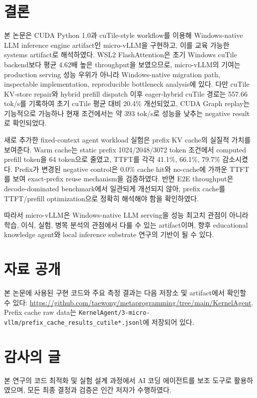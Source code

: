 \documentclass{kcc}
\begin{document}
\section{결론}
본 논문은 CUDA Python 1.0과 cuTile-style workflow를 이용해 Windows-native LLM inference engine artifact인 micro-vLLM을 구현하고, 이를 교육 가능한 systems artifact로 해석하였다. WSL2 FlashAttention은 초기 Windows cuTile backend보다 평균 4.62배 높은 throughput을 보였으므로, micro-vLLM의 기여는 production serving 성능 우위가 아니라 Windows-native migration path, inspectable implementation, reproducible bottleneck analysis에 있다. 다만 cuTile KV-store repair와 hybrid prefill dispatch 이후 eager-hybrid cuTile 경로는 557.66 tok/s를 기록하여 초기 cuTile 평균 대비 20.4\% 개선되었고, CUDA Graph replay는 기능적으로 가능하나 현재 조건에서는 약 393 tok/s로 성능을 낮추는 negative result로 확인되었다.

새로 추가한 fixed-context agent workload 실험은 prefix KV cache의 실질적 가치를 보여준다. Warm cache는 static prefix 1024/2048/3072 token 조건에서 computed prefill token을 64 token으로 줄였고, TTFT를 각각 41.1\%, 66.1\%, 79.7\% 감소시켰다. Prefix가 변경된 negative control은 0.0\% cache hit와 no-cache에 가까운 TTFT를 보여 exact-prefix reuse mechanism을 검증하였다. 반면 E2E throughput은 decode-dominated benchmark에서 일관되게 개선되지 않아, prefix cache를 TTFT/prefill optimization으로 정확히 해석해야 함을 확인하였다.

따라서 micro-vLLM은 Windows-native LLM serving을 성능 최고치 관점이 아니라 학습, 이식, 실험, 병목 분석의 관점에서 다룰 수 있는 artifact이며, 향후 educational knowledge agent와 local inference substrate 연구의 기반이 될 수 있다.

\section*{자료 공개}
본 논문에 사용된 구현 코드와 주요 측정 결과는 다음 저장소 및 artifact에서 확인할 수 있다: \url{https://github.com/taewony/metaprogramming/tree/main/KernelAgent}. Prefix cache raw data는 \texttt{KernelAgent/3-micro-vllm/prefix\_cache\_results\_cutile*.jsonl}에 저장되어 있다.

\section*{감사의 글}
본 연구의 코드 최적화 및 실험 설계 과정에서 AI 코딩 에이전트를 보조 도구로 활용하였으며, 모든 최종 결정과 검증은 인간 저자가 수행하였다.
\end{document}
